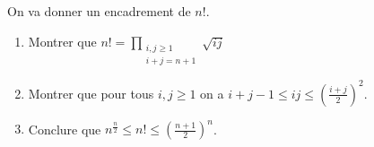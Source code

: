 
On va donner un encadrement de $n !$.

\begin{enumerate}

\item Montrer que $\displaystyle n! = \prod_{\substack{i,j \ge 1\\i+j = n+1}}  \sqrt{ij}$

\item Montrer que pour tous $i,j \ge 1$ on a $i+j-1 \le ij \le (\frac{i+j}{2})^2$.

\item Conclure que $n^{\frac{n}{2}} \le n ! \le (\frac{n+1}{2})^n$.

\end{enumerate}



